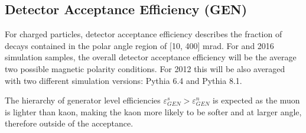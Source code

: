 

\subsection{Detector Acceptance Efficiency (GEN)}
For charged particles, \DIFaddbegin {}\DIFaddend detector acceptance efficiency describes the fraction of decays contained in the polar angle region of [10, 400] mrad.  
For \DIFaddbegin {} and 2016 simulation samples, the overall detector acceptance efficiency will be the average \DIFdelbegin {}\DIFdelend \DIFaddbegin {}\DIFaddend two possible magnetic polarity conditions. For 2012 this will be also averaged with two different simulation versions: Pythia 6.4\cite{pythia6} and Pythia 8.1\cite{pythia8}.

The hierarchy of generator level efficiencies $\varepsilon^{s}_{GEN} > \varepsilon^{n}_{GEN}$ is expected as the muon is lighter than kaon, making the kaon more likely to be softer and at larger angle, therefore outside of the acceptance. 

